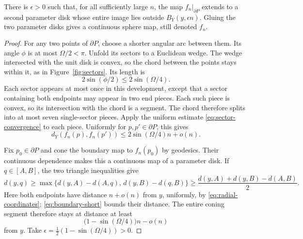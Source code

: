 \begin{lemma}\label{lem:outer-cap}
There is \(\epsilon>0\) such that, for all sufficiently large \(n\),
the map \(f_n|_{\partial P}\) extends to a second parameter disk whose
entire image lies outside \(B_Y(y,\epsilon n)\).
Gluing the two parameter disks gives a continuous sphere map, still
denoted \(f_n\).
\end{lemma}

\begin{proof}
For any two points of \(\partial P\), choose a shorter angular arc
between them.  Its angle \(\phi\) is at most \(\Omega/2<\pi\).
Unfold its sectors to a Euclidean wedge.  The wedge intersected with
the unit disk is convex, so the chord between the points stays within
it, as in Figure~\ref{fig:sectors}.  Its length is
\[
 2\sin(\phi/2)\le2\sin(\Omega/4).
\]
Each sector appears at most once in this development, except that a sector
containing both endpoints may appear in two end pieces.  Each such
piece is convex, so its intersection with the chord is a segment.
The chord therefore splits into at most seven single-sector pieces.  Apply the
uniform estimate \eqref{eq:sector-convergence} to each piece.  Uniformly
for \(p,p'\in\partial P\), this gives
\begin{equation}\label{eq:boundary-short}
 d_Y(f_n(p),f_n(p'))
 \le2\sin(\Omega/4)n+o(n).
\end{equation}

Fix \(p_0\in\partial P\) and cone the boundary map to \(f_n(p_0)\) by
geodesics.  Their continuous dependence makes this a continuous map
of a parameter disk.  If \(q\in[A,B]\), the two triangle inequalities
give
\[
 d(y,q)\ge
 \max\{d(y,A)-d(A,q),\,d(y,B)-d(q,B)\}
 \ge\frac{d(y,A)+d(y,B)-d(A,B)}2.
\]
Here both endpoints have distance \(n+o(n)\) from \(y\), uniformly,
by \eqref{eq:radial-coordinates}; \eqref{eq:boundary-short} bounds their
distance.  The entire coning segment therefore stays at distance at
least
\[
 \bigl(1-\sin(\Omega/4)\bigr)n-o(n)
\]
from \(y\).  Take
\(\epsilon=\tfrac12(1-\sin(\Omega/4))>0\).
\end{proof}
